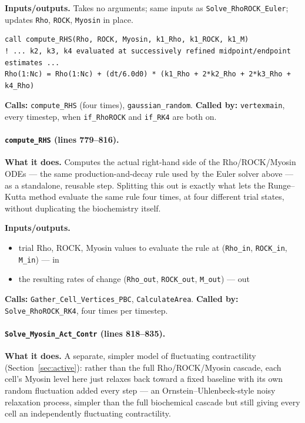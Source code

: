 \documentclass[11pt]{article}
\begin{document}
\textbf{Inputs/outputs.} Takes no arguments; same inputs as
\texttt{Solve\_RhoROCK\_Euler}; updates \texttt{Rho}, \texttt{ROCK}, \texttt{Myosin} in
place.

\begin{lstlisting}[caption={The classic four-stage Runge--Kutta combination in \texttt{Solve\_RhoROCK\_RK4}.}]
call compute_RHS(Rho, ROCK, Myosin, k1_Rho, k1_ROCK, k1_M)
! ... k2, k3, k4 evaluated at successively refined midpoint/endpoint estimates ...
Rho(1:Nc) = Rho(1:Nc) + (dt/6.0d0) * (k1_Rho + 2*k2_Rho + 2*k3_Rho + k4_Rho)
\end{lstlisting}

\textbf{Calls:} \texttt{compute\_RHS} (four times), \texttt{gaussian\_random}.
\textbf{Called by:} \texttt{vertexmain}, every timestep, when \texttt{if\_RhoROCK} and
\texttt{if\_RK4} are both on.

\paragraph{\texttt{compute\_RHS} (lines 779--816).}
\textbf{What it does.} Computes the actual right-hand side of the Rho/ROCK/Myosin ODEs
--- the same production-and-decay rule used by the Euler solver above --- as a
standalone, reusable step. Splitting this out is exactly what lets the Runge--Kutta
method evaluate the same rule four times, at four different trial states, without
duplicating the biochemistry itself.

\textbf{Inputs/outputs.}
\begin{itemize}[nosep]
  \item trial Rho, ROCK, Myosin values to evaluate the rule at (\texttt{Rho\_in}, \texttt{ROCK\_in}, \texttt{M\_in}) --- in
  \item the resulting rates of change (\texttt{Rho\_out}, \texttt{ROCK\_out}, \texttt{M\_out}) --- out
\end{itemize}

\textbf{Calls:} \texttt{Gather\_Cell\_Vertices\_PBC}, \texttt{CalculateArea}.
\textbf{Called by:} \texttt{Solve\_RhoROCK\_RK4}, four times per timestep.

\paragraph{\texttt{Solve\_Myosin\_Act\_Contr} (lines 818--835).}
\textbf{What it does.} A separate, simpler model of fluctuating contractility
(Section~\ref{sec:active}): rather than the full Rho/ROCK/Myosin cascade, each cell's
Myosin level here just relaxes back toward a fixed baseline with its own random
fluctuation added every step --- an Ornstein--Uhlenbeck-style noisy relaxation process,
simpler than the full biochemical cascade but still giving every cell an independently
fluctuating contractility.
\end{document}
